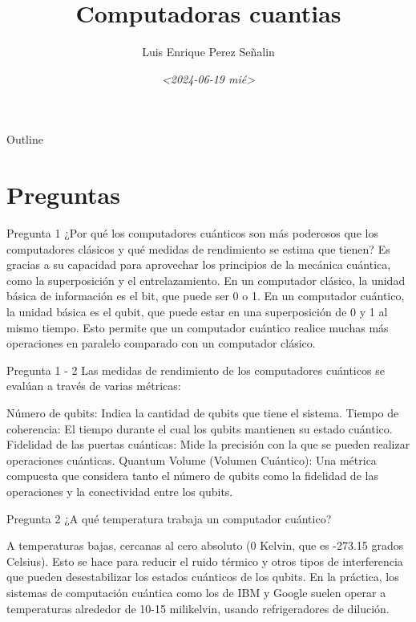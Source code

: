 \documentclass[presentation]{beamer}
\author{Luis Enrique Perez Señalin}
\date{\textit{<2024-06-19 mié>}}
\title{Computadoras cuantias}
\begin{document}
\maketitle
\begin{frame}{Outline}
\tableofcontents
\end{frame}


\section{Preguntas}
\label{sec:org58a5697}

\begin{frame}[label={sec:orgcf2818d}]{Pregunta 1}
¿Por qué los computadores cuánticos son más poderosos que los computadores clásicos y qué medidas de rendimiento se estima que tienen?
Es gracias a su capacidad para aprovechar los principios de la mecánica cuántica, como la superposición y el entrelazamiento. En un computador clásico, la unidad básica de información es el bit, que puede ser 0 o 1. En un computador cuántico, la unidad básica es el qubit, que puede estar en una superposición de 0 y 1 al mismo tiempo. Esto permite que un computador cuántico realice muchas más operaciones en paralelo comparado con un computador clásico.
\end{frame}

\begin{frame}[label={sec:orga57533f}]{Pregunta 1 - 2}
Las medidas de rendimiento de los computadores cuánticos se evalúan a través de varias métricas:

Número de qubits: Indica la cantidad de qubits que tiene el sistema.
Tiempo de coherencia: El tiempo durante el cual los qubits mantienen su estado cuántico.
Fidelidad de las puertas cuánticas: Mide la precisión con la que se pueden realizar operaciones cuánticas.
Quantum Volume (Volumen Cuántico): Una métrica compuesta que considera tanto el número de qubits como la fidelidad de las operaciones y la conectividad entre los qubits.
\end{frame}

\begin{frame}[label={sec:org9ba2968}]{Pregunta 2}
¿A qué temperatura trabaja un computador cuántico?

A temperaturas bajas, cercanas al cero absoluto (0 Kelvin, que es -273.15 grados Celsius). Esto se hace para reducir el ruido térmico y otros tipos de interferencia que pueden desestabilizar los estados cuánticos de los qubits. En la práctica, los sistemas de computación cuántica como los de IBM y Google suelen operar a temperaturas alrededor de 10-15 milikelvin, usando refrigeradores de dilución.
\end{frame}
\end{document}

